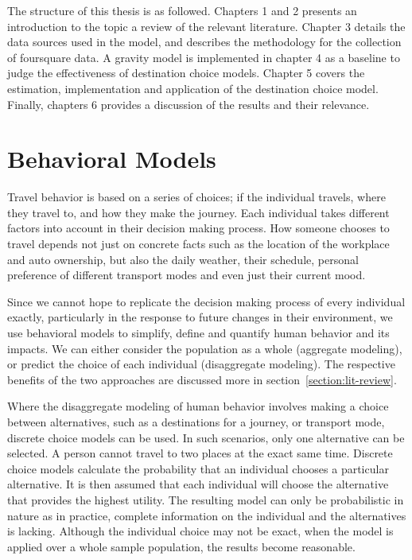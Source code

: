 The structure of this thesis is as followed. Chapters 1 and 2 presents an introduction to the topic a review of the relevant literature. Chapter 3 details the data sources used in the model, and describes the methodology for the collection of foursquare data. A gravity model is implemented in chapter 4 as a baseline to judge the effectiveness of destination choice models. Chapter 5 covers the estimation, implementation and application of the destination choice model. Finally, chapters 6 provides a discussion of the results and their relevance.
	
\section{Behavioral Models}
Travel behavior is based on a series of choices; if the individual travels, where they travel to, and how they make the journey. Each individual takes different factors into account in their decision making process. How someone chooses to travel depends not just on concrete facts such as the location of the workplace and auto ownership, but also the daily weather, their schedule, personal preference of different transport modes and even just their current mood.

Since we cannot hope to replicate the decision making process of every individual exactly, particularly in the response to future changes in their environment,  we use behavioral models to simplify, define and quantify human behavior and its impacts. We can either consider the population as a whole (aggregate modeling), or predict the choice of each individual (disaggregate modeling). The respective benefits of the two approaches are discussed more in section~\ref{section:lit-review}.

Where the disaggregate modeling of human behavior involves making a choice between alternatives, such as a destinations for a journey, or transport mode, discrete choice models can be used. In such scenarios, only one alternative can be selected. A person cannot travel to two places at the exact same time. Discrete choice models calculate the probability that an individual chooses a particular alternative. It is then assumed that each individual will choose the alternative that provides the highest utility. The resulting model can only be probabilistic in nature as in practice, complete information on the individual and the alternatives is lacking. Although the individual choice may not be exact, when the model is applied  over a whole sample population, the results become reasonable.  

